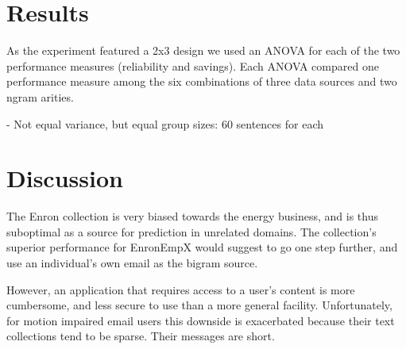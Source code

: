 \documentclass{sigchi}
\newcommand\T{\rule{0pt}{2.5ex}}%
\newcommand\B{\rule[-1ex]{0pt}{0pt}}%
\begin{document}
\section{Results}

As the experiment featured a 2x3 design we used an ANOVA for each of
the two performance measures (reliability and savings). Each ANOVA
compared one performance measure among the six combinations of three
data sources and two ngram arities.

- Not equal variance, but equal group sizes: 60 sentences for each



\section{Discussion}
The Enron collection is very biased towards the energy business, and
is thus suboptimal as a source for prediction in unrelated
domains. The collection's superior performance for EnronEmpX would
suggest to go one step further, and use an individual's own email as
the bigram source. 

However, an application that requires access to a user's content is
more cumbersome, and less secure to use than a more general facility.
Unfortunately, for motion impaired email users this downside is
exacerbated because their text collections tend to be sparse.
Their messages are short.
\end{document}
